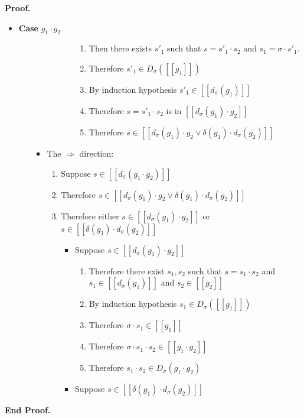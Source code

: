 \documentclass{article}
\newcommand{\interp}[1]{[\![{#1}]\!]}
\newcommand{\semderiv}[2]{D_{#1}({#2})}
\newcommand{\deriv}[2]{d_{#1}({#2})}
\newcommand{\emptify}[1]{\delta({#1})}
\newenvironment{proof}{\noindent\textbf{Proof.}}
{\noindent\textbf{End Proof.}}
\newenvironment{caseblock}{\begin{itemize}}{\end{itemize}}
\newenvironment{case}[1]{\item \textbf{Case} {#1}\\}{}
\begin{document}
\begin{proof}
\begin{caseblock}
\begin{case}{$g_1\cdot g_2$}
\begin{enumerate}
\begin{itemize}
\begin{enumerate}
\begin{itemize}
\begin{enumerate}
                     \item Then there exists $s'_1$ such that $s = s'_1 \cdot s_2$ and $s_1 = \sigma \cdot s'_1$. 
                     \item Therefore $s'_1 \in \semderiv{\sigma}{\interp{g_1}}$
                     \item By induction hypothesis $s'_1 \in \interp{\deriv{\sigma}{g_1}}$
                     \item Therefore $s = s'_1 \cdot s_2$ is in $\interp{\deriv{\sigma}{g_1}\cdot g_2}$
                     \item Therefore $s \in \interp{\deriv{\sigma}{g_1}\cdot g_2 \vee \emptify{g_1}\cdot\deriv{\sigma}{g_2}}$
                   \end{enumerate}
                \end{itemize}
            \end{enumerate}
          \item The $\Rightarrow$ direction: 
            \begin{enumerate}
              \item Suppose $s \in \interp{\deriv{\sigma}{g_1\cdot g_2}}$
              \item Therefore $s \in \interp{\deriv{\sigma}{g_1}\cdot g_2 \vee \emptify{g_1}\cdot\deriv{\sigma}{g_2}}$
              \item Therefore either $s \in \interp{\deriv{\sigma}{g_1}\cdot g_2}$ or 
                    $s \in \interp{\emptify{g_1}\cdot\deriv{\sigma}{g_2} }$
                \begin{itemize}
                  \item Suppose $s \in \interp{\deriv{\sigma}{g_1}\cdot g_2}$ 
                    \begin{enumerate}
                      \item Therefore there exist $s_1, s_2$ such that $s = s_1 \cdot s_2$ and 
                        $s_1 \in \interp{\deriv{\sigma}{g_1}}$ and $s_2 \in \interp{g_2}$
                      \item By induction hypothesis $s_1 \in \semderiv{\sigma}{\interp{g_1}}$
                      \item Therefore $\sigma \cdot s_1 \in \interp{g_1}$
                      \item Therefore $\sigma \cdot s_1 \cdot s_2 \in \interp{g_1 \cdot g_2}$
                      \item Therefore $s_1 \cdot s_2 \in \semderiv{\sigma}{g_1 \cdot g_2}$
                    \end{enumerate}
                  \item Suppose $s \in \interp{\emptify{g_1}\cdot\deriv{\sigma}{g_2} }$


\end{itemize}
\end{enumerate}
\end{itemize}
\end{enumerate}
\end{case}
\end{caseblock}
\end{proof}
\end{document}
